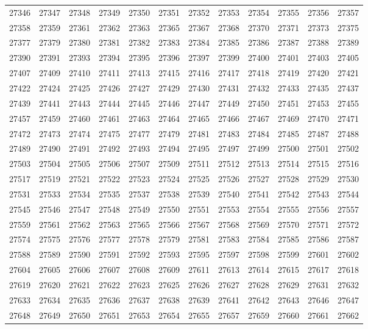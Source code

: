 \begin{center}
\begin{longtable}{llllllllllll}
27346 &27347 &27348 &27349 &27350 &27351 &27352 &27353 &27354 &27355 &27356 &27357 \\
27358 &27359 &27361 &27362 &27363 &27365 &27367 &27368 &27370 &27371 &27373 &27375 \\
27377 &27379 &27380 &27381 &27382 &27383 &27384 &27385 &27386 &27387 &27388 &27389 \\
27390 &27391 &27393 &27394 &27395 &27396 &27397 &27399 &27400 &27401 &27403 &27405 \\
27407 &27409 &27410 &27411 &27413 &27415 &27416 &27417 &27418 &27419 &27420 &27421 \\
27422 &27424 &27425 &27426 &27427 &27429 &27430 &27431 &27432 &27433 &27435 &27437 \\
27439 &27441 &27443 &27444 &27445 &27446 &27447 &27449 &27450 &27451 &27453 &27455 \\
27457 &27459 &27460 &27461 &27463 &27464 &27465 &27466 &27467 &27469 &27470 &27471 \\
27472 &27473 &27474 &27475 &27477 &27479 &27481 &27483 &27484 &27485 &27487 &27488 \\
27489 &27490 &27491 &27492 &27493 &27494 &27495 &27497 &27499 &27500 &27501 &27502 \\
27503 &27504 &27505 &27506 &27507 &27509 &27511 &27512 &27513 &27514 &27515 &27516 \\
27517 &27519 &27521 &27522 &27523 &27524 &27525 &27526 &27527 &27528 &27529 &27530 \\
27531 &27533 &27534 &27535 &27537 &27538 &27539 &27540 &27541 &27542 &27543 &27544 \\
27545 &27546 &27547 &27548 &27549 &27550 &27551 &27553 &27554 &27555 &27556 &27557 \\
27559 &27561 &27562 &27563 &27565 &27566 &27567 &27568 &27569 &27570 &27571 &27572 \\
27574 &27575 &27576 &27577 &27578 &27579 &27581 &27583 &27584 &27585 &27586 &27587 \\
27588 &27589 &27590 &27591 &27592 &27593 &27595 &27597 &27598 &27599 &27601 &27602 \\
27604 &27605 &27606 &27607 &27608 &27609 &27611 &27613 &27614 &27615 &27617 &27618 \\
27619 &27620 &27621 &27622 &27623 &27625 &27626 &27627 &27628 &27629 &27631 &27632 \\
27633 &27634 &27635 &27636 &27637 &27638 &27639 &27641 &27642 &27643 &27646 &27647 \\
27648 &27649 &27650 &27651 &27653 &27654 &27655 &27657 &27659 &27660 &27661 &27662 \\

\end{longtable}
\end{center}
